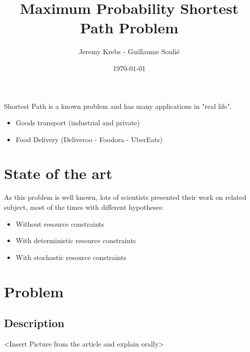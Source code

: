 \documentclass{beamer}
\title{Maximum Probability Shortest Path Problem}
\author{Jeremy Krebs - Guillaume Soulié}
\institute{Université Paris Saclay}
\date{\today}
\begin{document}
\begin{frame}
\titlepage
\end{frame}

\begin{frame}
  \tableofcontents
\end{frame}      

\begin{frame}
Shortest Path is a known problem and has many applications in "real life".

\begin{itemize}
	\item Goods transport (industrial and private)
	\item Food Delivery (Deliveroo - Foodora - UberEats)
\end{itemize}

\end{frame}

\section{State of the art}

\begin{frame}

As this problem is well known, lots of scientists presented their work on related subject, most of the times with different hypotheses:

\begin{itemize}
	\item<2-> Without resource constraints
	\item<3-> With deterministic resource constraints
	\item<4-> With stochastic resource constraints
\end{itemize}

\end{frame}


\section{Problem}
\subsection{Description}

\begin{frame}
	<Insert Picture from the article and explain orally>
\end{frame}
\end{document}
